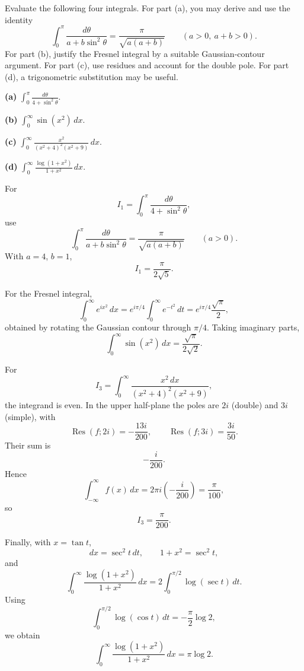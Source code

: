 \begin{problem}[CP-IV-0010]
\label{prob:cp-iv-0010}
Evaluate the following four integrals. For part (a), you may derive and use the identity
\[
\int_0^\pi\frac{d\theta}{a+b\sin^2\theta}
=\frac{\pi}{\sqrt{a(a+b)}}
\qquad (a>0,\ a+b>0).
\]
For part (b), justify the Fresnel integral by a suitable Gaussian-contour argument. For part (c), use residues and account for the double pole. For part (d), a trigonometric substitution may be useful.

\medskip
\noindent\textbf{(a)} $\displaystyle\int_0^\pi\frac{d\theta}{4+\sin^2\theta}$.

\medskip
\noindent\textbf{(b)} $\displaystyle\int_0^\infty\sin(x^2)\,dx$.

\medskip
\noindent\textbf{(c)} $\displaystyle\int_0^\infty\frac{x^2}{(x^2+4)^2(x^2+9)}\,dx$.

\medskip
\noindent\textbf{(d)} $\displaystyle\int_0^\infty\frac{\log(1+x^2)}{1+x^2}\,dx$.
\end{problem}

\begin{solution}
For
\[
I_1=\int_0^\pi\frac{d\theta}{4+\sin^2\theta},
\]
use
\[
\int_0^\pi\frac{d\theta}{a+b\sin^2\theta}
=
\frac{\pi}{\sqrt{a(a+b)}}
\qquad(a>0).
\]
With \(a=4\), \(b=1\),
\[
\boxed{I_1=\frac{\pi}{2\sqrt5}}.
\]

For the Fresnel integral,
\[
\int_0^\infty e^{ix^2}\,dx
=
e^{i\pi/4}\int_0^\infty e^{-t^2}\,dt
=
e^{i\pi/4}\frac{\sqrt\pi}{2},
\]
obtained by rotating the Gaussian contour through \(\pi/4\). Taking imaginary parts,
\[
\boxed{
\int_0^\infty\sin(x^2)\,dx
=
\frac{\sqrt\pi}{2\sqrt2}.
}
\]

For
\[
I_3
=
\int_0^\infty
\frac{x^2\,dx}{(x^2+4)^2(x^2+9)},
\]
the integrand is even. In the upper half-plane the poles are \(2i\) (double) and \(3i\) (simple), with
\[
\operatorname{Res}(f;2i)=-\frac{13i}{200},
\qquad
\operatorname{Res}(f;3i)=\frac{3i}{50}.
\]
Their sum is
\[
-\frac{i}{200}.
\]
Hence
\[
\int_{-\infty}^{\infty}f(x)\,dx
=
2\pi i\left(-\frac{i}{200}\right)
=
\frac{\pi}{100},
\]
so
\[
\boxed{I_3=\frac{\pi}{200}}.
\]

Finally, with \(x=\tan t\),
\[
dx=\sec^2t\,dt,
\qquad
1+x^2=\sec^2t,
\]
and
\[
\int_0^\infty\frac{\log(1+x^2)}{1+x^2}\,dx
=
2\int_0^{\pi/2}\log(\sec t)\,dt.
\]
Using
\[
\int_0^{\pi/2}\log(\cos t)\,dt
=
-\frac{\pi}{2}\log2,
\]
we obtain
\[
\boxed{
\int_0^\infty\frac{\log(1+x^2)}{1+x^2}\,dx
=
\pi\log2.
}
\]
\end{solution}


